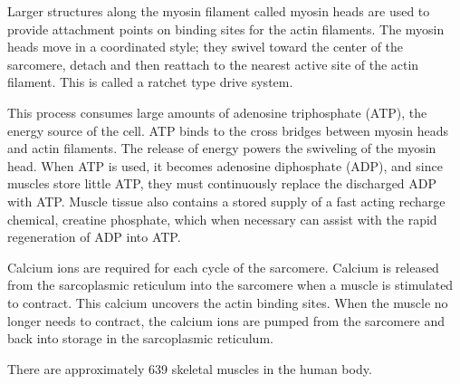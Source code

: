 Larger structures along the myosin filament called myosin heads are used to provide attachment points on binding sites for the actin filaments. The myosin heads move in a coordinated style; they swivel toward the center of the sarcomere, detach and then reattach to the nearest active site of the actin filament. This is called a ratchet type drive system.

This process consumes large amounts of adenosine triphosphate (ATP), the energy source of the cell. ATP binds to the cross bridges between myosin heads and actin filaments. The release of energy powers the swiveling of the myosin head. When ATP is used, it becomes adenosine diphosphate (ADP), and since muscles store little ATP, they must continuously replace the discharged ADP with ATP. Muscle tissue also contains a stored supply of a fast acting recharge chemical, creatine phosphate, which when necessary can assist with the rapid regeneration of ADP into ATP.

Calcium ions are required for each cycle of the sarcomere. Calcium is released from the sarcoplasmic reticulum into the sarcomere when a muscle is stimulated to contract. This calcium uncovers the actin binding sites. When the muscle no longer needs to contract, the calcium ions are pumped from the sarcomere and back into storage in the sarcoplasmic reticulum.

There are approximately 639 skeletal muscles in the human body.



